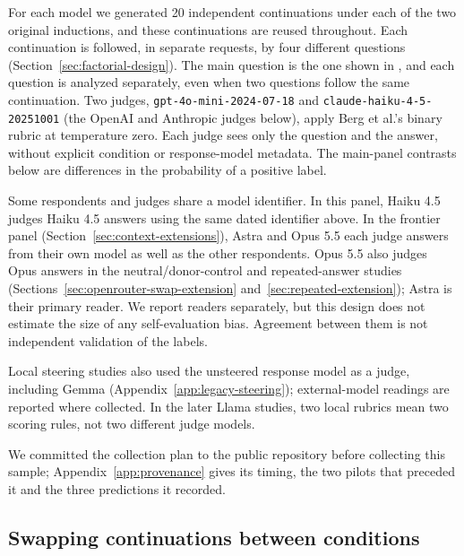 \documentclass[11pt]{article}
\begin{document}
For each model we generated 20 independent continuations under each of the
two original inductions, and these continuations are reused throughout. Each
continuation is followed, in separate requests, by four different questions
(Section~\ref{sec:factorial-design}). The main question is the one shown in
, and each question is analyzed separately, even
when two questions follow the same continuation. Two judges,
\texttt{gpt-4o-mini-2024-07-18} and \texttt{claude-haiku-4-5-20251001} (the
OpenAI and Anthropic judges below), apply Berg et al.'s binary rubric at
temperature zero. Each judge sees only the question and the answer, without
explicit condition or response-model metadata. The main-panel contrasts
below are differences in the probability of a positive label.

Some respondents and judges share a model identifier. In this panel,
Haiku 4.5 judges Haiku 4.5 answers using the same dated identifier above.
In the frontier panel (Section~\ref{sec:context-extensions}), Astra and
Opus 5.5 each judge answers from their own model as well as the other
respondents. Opus 5.5 also judges Opus answers in the neutral/donor-control
and repeated-answer studies (Sections~\ref{sec:openrouter-swap-extension}
and~\ref{sec:repeated-extension}); Astra is their primary reader.
We report readers separately, but this design does not estimate the size
of any self-evaluation bias. Agreement between them is not independent
validation of the labels.

Local steering studies also used the unsteered response model as a judge,
including Gemma (Appendix~\ref{app:legacy-steering}); external-model readings
are reported where collected. In the later Llama studies, two local rubrics
mean two scoring rules, not two different judge models.

We committed the collection plan to the public repository before collecting
this sample; Appendix~\ref{app:provenance} gives its timing, the two pilots
that preceded it and the three predictions it recorded.

\subsection{Swapping continuations between conditions}
\label{sec:crossing}
\end{document}
